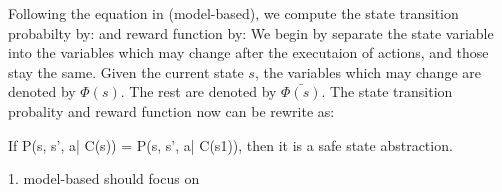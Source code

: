 Following the equation in (model-based), we compute the state transition probabilty by:
and reward function by:
We begin by separate the state variable into the variables which may change after the executaion of
actions, and those stay the same.
Given the current state $s$, the variables which may change are denoted by $\Phi(s)$.
The rest are denoted by $\bar{\Phi(s)}.$ 
The state transition probality and reward function now can be rewrite as:


If P(s, s', a| C(s)) = P(s, s', a| C(s1)),  
then it is a safe state abstraction.


1. model-based should focus on 


